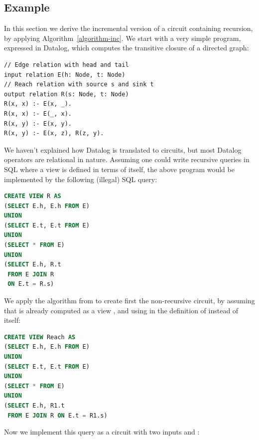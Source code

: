 \subsection{Example}\label{sec:recursive-example}

In this section we derive the incremental version of a circuit containing
recursion, by applying Algorithm~\ref{algorithm-inc}.  We start with a very simple
program, expressed in Datalog, which computes the transitive closure of a directed
graph:

\begin{lstlisting}[language=ddlog]
// Edge relation with head and tail
input relation E(h: Node, t: Node)
// Reach relation with source s and sink t
output relation R(s: Node, t: Node)
R(x, x) :- E(x, _).
R(x, x) :- E(_, x).
R(x, y) :- E(x, y).
R(x, y) :- E(x, z), R(z, y).
\end{lstlisting}

We haven't explained how Datalog is translated to circuits, but most Datalog
operators are relational in nature.  Assuming one could write 
recursive queries in SQL where a view is defined in terms of itself, the
above program would be implemented by the following (illegal) SQL query:

\begin{lstlisting}[language=SQL]
CREATE VIEW R AS 
(SELECT E.h, E.h FROM E)
UNION
(SELECT E.t, E.t FROM E)
UNION
(SELECT * FROM E)
UNION
(SELECT E.h, R.t 
 FROM E JOIN R 
 ON E.t = R.s)
\end{lstlisting}

We apply the algorithm from  to create first the non-recursive circuit,
by assuming that  is already computed as a view , and using 
in the definition of  instead of itself:

\begin{lstlisting}[language=SQL]
CREATE VIEW Reach AS 
(SELECT E.h, E.h FROM E)
UNION
(SELECT E.t, E.t FROM E)
UNION
(SELECT * FROM E)
UNION
(SELECT E.h, R1.t 
 FROM E JOIN R ON E.t = R1.s)
\end{lstlisting}

Now we implement this query as a \dbsp circuit with two inputs  and :


